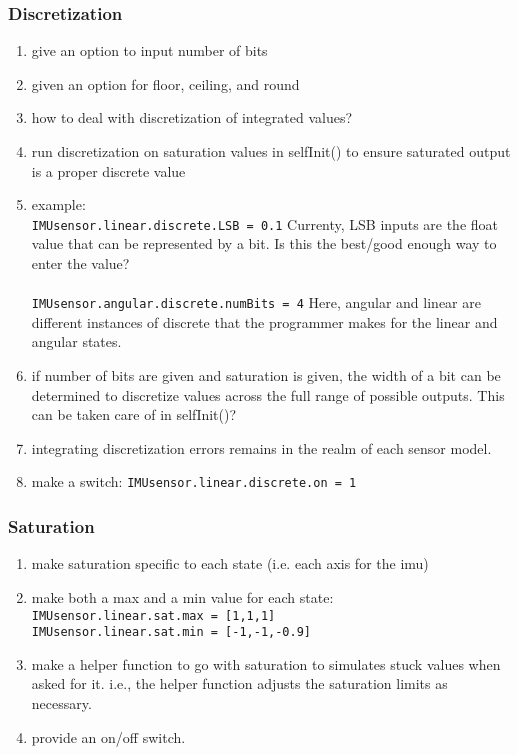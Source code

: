 \documentclass[]{BasiliskReportMemo}
\begin{document}
\subsubsection{Discretization}
\begin{enumerate}
	\item give an option to input number of bits
	\item given an option for floor, ceiling, and round
	\item how to deal with discretization of integrated values?
	\item run discretization on saturation values in selfInit() to ensure saturated output is a proper discrete value
	\item example:\\
	\verb|IMUsensor.linear.discrete.LSB = 0.1| Currenty, LSB inputs are the float value that can be represented by a bit. Is this the best/good enough way to enter the value?\\\\
	\verb|IMUsensor.angular.discrete.numBits = 4| Here, angular and linear are different instances of discrete that the programmer makes for the linear and angular states.
	\item if number of bits are given and saturation is given, the width of a bit can be determined to discretize values across the full range of possible outputs. This can be taken care of in selfInit()?
	\item integrating discretization errors remains in the realm of each sensor model.
	\item make a switch: \verb|IMUsensor.linear.discrete.on = 1|
\end{enumerate}
\subsubsection{Saturation}
\begin{enumerate}
	\item make saturation specific to each state (i.e. each axis for the imu)
	\item make both a max and a min value for each state: \\
	\verb|IMUsensor.linear.sat.max = [1,1,1]|\\
	\verb|IMUsensor.linear.sat.min = [-1,-1,-0.9]|\\
	\item make a helper function to go with saturation to simulates stuck values when asked for it. i.e., the helper function adjusts the saturation limits as necessary.
	\item provide an on/off switch.
\end{enumerate}
\end{document}
